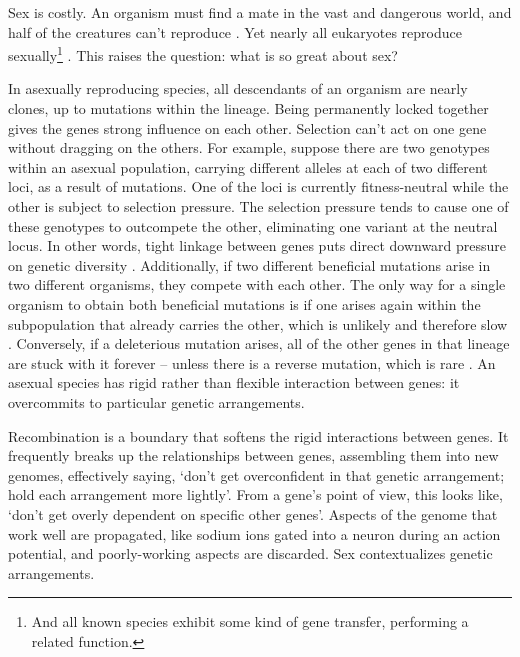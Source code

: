 \documentclass[12pt]{article}
\begin{document}

Sex is costly. An organism must find a mate in the vast and dangerous world, and half of the creatures can't reproduce \citep{smith1971origin, lehtonen2012many, smith1978evolution, goodenough2014origins}. Yet nearly all eukaryotes reproduce sexually\footnote{And all known species exhibit some kind of gene transfer, performing a related function.} \citep{speijer2015sex, bell1982masterpiece}. This raises the question: what is so great about sex?

In asexually reproducing species, all descendants of an organism are nearly clones, up to mutations within the lineage. Being permanently locked together gives the genes strong influence on each other. Selection can't act on one gene without dragging on the others. For example, suppose there are two genotypes within an asexual population, carrying different alleles at each of two different loci, as a result of mutations. One of the loci is currently fitness-neutral while the other is subject to selection pressure. The selection pressure tends to cause one of these genotypes to outcompete the other, eliminating one variant at the neutral locus. In other words, tight linkage between genes puts direct downward pressure on genetic diversity \citep{charlesworth1993effect, hudson1995deleterious}. Additionally, if two different beneficial mutations arise in two different organisms, they compete with each other. The only way for a single organism to obtain both beneficial mutations is if one arises again within the subpopulation that already carries the other, which is unlikely and therefore slow \citep{hill1966effect, felsenstein1974evolutionary, weismann1889essays, fisher1930genetial, muller1932some, crow1965evolution}. Conversely, if a deleterious mutation arises, all of the other genes in that lineage are stuck with it forever -- unless there is a reverse mutation, which is rare \citep{keightley2006interference, muller1932some}. An asexual species has rigid rather than flexible interaction between genes: it overcommits to particular genetic arrangements.

Recombination is a boundary that softens the rigid interactions between genes. It frequently breaks up the relationships between genes, assembling them into new genomes, effectively saying, `don't get overconfident in that genetic arrangement; hold each arrangement more lightly'. From a gene's point of view, this looks like, `don't get overly dependent on specific other genes'. Aspects of the genome that work well are propagated, like sodium ions gated into a neuron during an action potential, and poorly-working aspects are discarded. Sex contextualizes genetic arrangements. 
\end{document}
